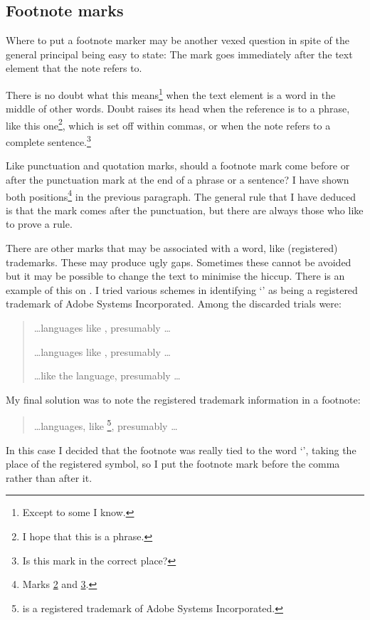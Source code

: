 \documentclass[10pt,a4paper,extrafontsizes]{memoir}
\begin{document}
\subsection{Footnote marks}

\begin{paracol}{2}
\switchEng
    Where to put a footnote marker may be another vexed question in spite
of the general principal being easy to state: The mark goes immediately
after the text element that the note refers to.

    There is no doubt what this means\footnote{Except to some I know.} when
the text element is a word in the middle of other words. Doubt raises
its head when the reference is to a phrase, like this one\footnote{I hope
that this is a phrase.\label{fn:phrase}}, 
which is set off within commas, or when the note refers to a complete 
sentence.\footnote{Is this mark in the correct place?\label{fn:sentence}}

    Like punctuation and quotation marks, 
should a footnote mark come before
or after the punctuation mark at the end of a phrase or a sentence? I have
shown both positions\footnote{Marks \ref{fn:phrase} and \ref{fn:sentence}.}
 in the previous paragraph. The 
general rule that I have deduced is that the mark comes after the 
punctuation, but there are always those who like to prove a rule.
\end{paracol}

\begin{paracol}{2}
\switchEng
   There are other marks that may be associated with a word, like 
(registered) trademarks. These may produce ugly gaps. Sometimes these
cannot be avoided but it may be possible to change the text to minimise
the hiccup. There is an example of this on . I tried various
schemes in identifying `\pscript' as being a registered trademark of
Adobe Systems Incorporated. Among the discarded trials were:
\begin{quote}
\ldots languages like \pscript\texttrademark, presumably \ldots

\ldots languages like \pscript\textsuperscript{\textregistered}, presumably \ldots

\ldots like the \pscript\textsuperscript{\textregistered}{} language, presumably \ldots

\end{quote}
My final solution was to note the registered trademark information in
a footnote:
\begin{quote}
\ldots languages, like \pscript\footnote{\pscript{} is a registered 
trademark of Adobe Systems Incorporated.}, presumably \ldots
\end{quote}
In this case I decided that the footnote was really tied to the word
`\pscript', taking the place of the registered symbol, so I put the
footnote mark before the comma rather than after it.
\end{paracol}
\end{document}
